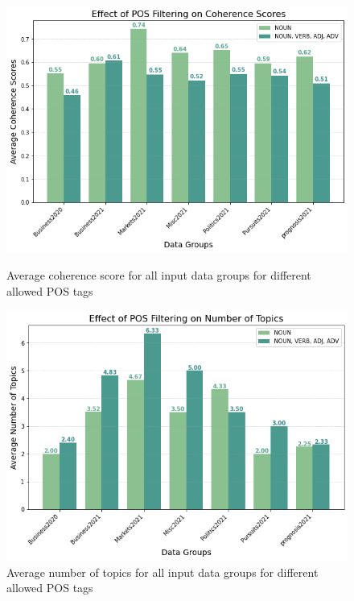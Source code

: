 \begin{figure}
  \centering
    \begin{minipage}[t]{.49\linewidth}
      \centering
      \includegraphics[width=\linewidth]{images/eval/pos_coherence.png}
      \caption{Average coherence score for all input data groups for different allowed POS tags}
      \label{fig:pos_topic}
    \end{minipage}
    \begin{minipage}[t]{.49\linewidth}
      \centering
      \includegraphics[width=\linewidth]{images/eval/topics_pos.png}
      \caption{Average number of topics for all input data groups for different allowed POS tags}
       \label{fig:topics_pos}
    \end{minipage}
  \end{figure}

